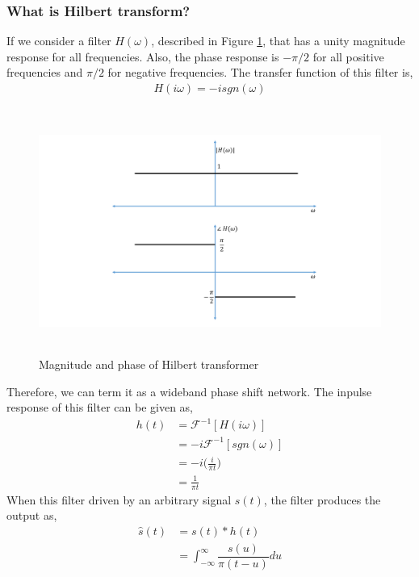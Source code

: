 \subsubsection{What is Hilbert transform?}
If we consider a filter $H(\omega)$, described in Figure \ref{Hilbert_Transformer}, that has a unity magnitude response for all frequencies. Also, the phase response is $-\pi/2$ for all positive frequencies and $\pi/2$ for negative frequencies. The transfer function of this filter is,
\begin{equation}
\begin{split}
H(i\omega)=-isgn(\omega)
\end{split}
\label{}
\end{equation}
\begin{figure}[h]
	\centering
	\includegraphics[width=1.0\textwidth, height=8cm]{./sdf/simplified_coherent_receiver/figures/HT.pdf}
	\caption{Magnitude and phase of Hilbert transformer}\label{Hilbert_Transformer}
\end{figure}
Therefore, we can term it as a wideband phase shift network. The inpulse response of this filter can be given as,
\begin{equation}
\begin{split}
h(t)&=\mathcal{F}^{-1}[H(i\omega)]\\
&=-i\mathcal{F}^{-1}[sgn(\omega)]\\
&=-i\bigg(\frac{i}{\pi t}\bigg)\\
&=\frac{1}{\pi t}
\end{split}
\label{}
\end{equation}
When this filter driven by an arbitrary signal $s(t)$, the filter produces the output as,
\begin{equation}
\begin{split}
\hat{s}(t)&=s(t) * h(t)\\
&=\int_{-\infty}^{\infty} \dfrac{s(u)}{\pi(t-u)}du\\
\end{split}
\label{}
\end{equation}
